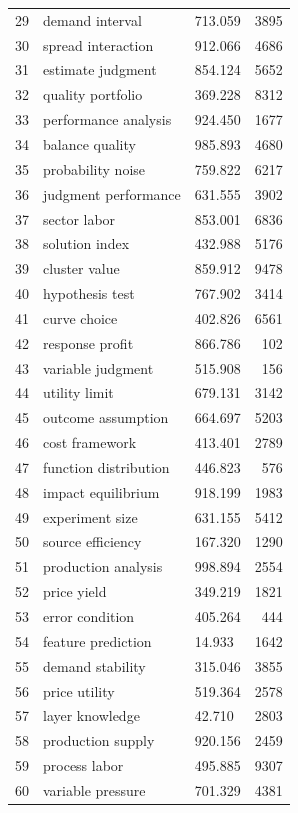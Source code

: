 \documentclass[11pt]{report}
\begin{document}
\begin{longtable}{rllr}
29 & demand interval & 713.059 & 3895 \\
30 & spread interaction & 912.066 & 4686 \\
31 & estimate judgment & 854.124 & 5652 \\
32 & quality portfolio & 369.228 & 8312 \\
33 & performance analysis & 924.450 & 1677 \\
34 & balance quality & 985.893 & 4680 \\
35 & probability noise & 759.822 & 6217 \\
36 & judgment performance & 631.555 & 3902 \\
37 & sector labor & 853.001 & 6836 \\
38 & solution index & 432.988 & 5176 \\
39 & cluster value & 859.912 & 9478 \\
40 & hypothesis test & 767.902 & 3414 \\
41 & curve choice & 402.826 & 6561 \\
42 & response profit & 866.786 & 102 \\
43 & variable judgment & 515.908 & 156 \\
44 & utility limit & 679.131 & 3142 \\
45 & outcome assumption & 664.697 & 5203 \\
46 & cost framework & 413.401 & 2789 \\
47 & function distribution & 446.823 & 576 \\
48 & impact equilibrium & 918.199 & 1983 \\
49 & experiment size & 631.155 & 5412 \\
50 & source efficiency & 167.320 & 1290 \\
51 & production analysis & 998.894 & 2554 \\
52 & price yield & 349.219 & 1821 \\
53 & error condition & 405.264 & 444 \\
54 & feature prediction & 14.933 & 1642 \\
55 & demand stability & 315.046 & 3855 \\
56 & price utility & 519.364 & 2578 \\
57 & layer knowledge & 42.710 & 2803 \\
58 & production supply & 920.156 & 2459 \\
59 & process labor & 495.885 & 9307 \\
60 & variable pressure & 701.329 & 4381 \\
\end{longtable}
\end{document}
